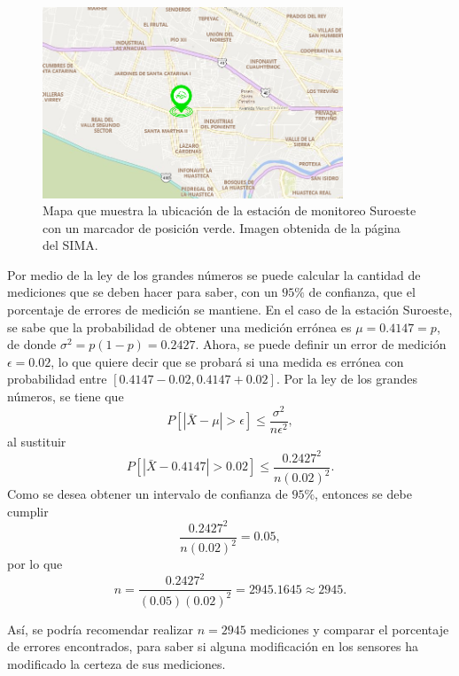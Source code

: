 \documentclass[paper=leter, fontsize=11pt]{scrartcl}
\begin{document}
\begin{figure}
  \centering
  \includegraphics[width=0.8\textwidth]{so.png}
\caption{Mapa que muestra la ubicación de la estación de monitoreo Suroeste con un marcador de posición verde. Imagen obtenida de la página del SIMA\cite{aireNL}.}
\label{fig:so_geo}
\end{figure}

Por medio de la ley de los grandes números se puede calcular la cantidad de mediciones que se deben hacer para saber, con un $95\%$ de confianza, que el porcentaje de errores de medición se mantiene. En el caso de la estación Suroeste, se sabe que la probabilidad de obtener una medición errónea es $\mu = 0.4147 = p$, de donde $\sigma^2 = p(1 - p) = 0.2427$. Ahora, se puede definir un error de medición $\epsilon = 0.02$, lo que quiere decir que se probará si una medida es errónea con probabilidad entre $[0.4147 - 0.02, 0.4147 + 0.02]$. Por la ley de los grandes números, se tiene que
$$P[|\bar{X} - \mu| > \epsilon] \leq \frac{\sigma^2}{n \epsilon^2},$$ 
al sustituir
$$P[|\bar{X} - 0.4147| > 0.02] \leq \frac{0.2427^2}{n (0.02)^2}.$$
Como se desea obtener un intervalo de confianza de $95\%$, entonces se debe cumplir
$$\frac{0.2427^2}{n (0.02)^2} = 0.05,$$
por lo que
$$n = \frac{0.2427^2}{(0.05) (0.02)^2} = 2945.1645 \approx 2945.$$

Así, se podría recomendar realizar $n = 2945$ mediciones y comparar el porcentaje de errores encontrados, para saber si alguna modificación en los sensores ha modificado la certeza de sus mediciones.
 


\end{document}
